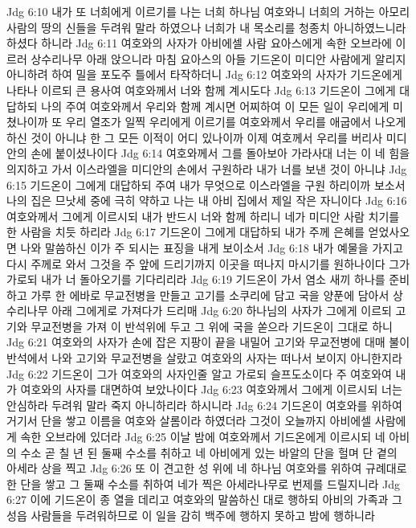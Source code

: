 Jdg 6:10  내가 또 너희에게 이르기를 나는 너희 하나님 여호와니 너희의 거하는 아모리 사람의 땅의 신들을 두려워 말라 하였으나 너희가 내 목소리를 청종치 아니하였느니라 하셨다 하니라
Jdg 6:11  여호와의 사자가 아비에셀 사람 요아스에게 속한 오브라에 이르러 상수리나무 아래 앉으니라 마침 요아스의 아들 기드온이 미디안 사람에게 알리지 아니하려 하여 밀을 포도주 틀에서 타작하더니
Jdg 6:12  여호와의 사자가 기드온에게 나타나 이르되 큰 용사여 여호와께서 너와 함께 계시도다
Jdg 6:13  기드온이 그에게 대답하되 나의 주여 여호와께서 우리와 함께 계시면 어찌하여 이 모든 일이 우리에게 미쳤나이까 또 우리 열조가 일찍 우리에게 이르기를 여호와께서 우리를 애굽에서 나오게 하신 것이 아니냐 한 그 모든 이적이 어디 있나이까 이제 여호께서 우리를 버리사 미디안의 손에 붙이셨나이다
Jdg 6:14  여호와께서 그를 돌아보아 가라사대 너는 이 네 힘을 의지하고 가서 이스라엘을 미디안의 손에서 구원하라 내가 너를 보낸 것이 아니냐
Jdg 6:15  기드온이 그에게 대답하되 주여 내가 무엇으로 이스라엘을 구원 하리이까 보소서 나의 집은 므낫세 중에 극히 약하고 나는 내 아비 집에서 제일 작은 자니이다
Jdg 6:16  여호와께서 그에게 이르시되 내가 반드시 너와 함께 하리니 네가 미디안 사람 치기를 한 사람을 치듯 하리라
Jdg 6:17  기드온이 그에게 대답하되 내가 주께 은혜를 얻었사오면 나와 말씀하신 이가 주 되시는 표징을 내게 보이소서
Jdg 6:18  내가 예물을 가지고 다시 주께로 와서 그것을 주 앞에 드리기까지 이곳을 떠나지 마시기를 원하나이다 그가 가로되 내가 너 돌아오기를 기다리리라
Jdg 6:19  기드온이 가서 염소 새끼 하나를 준비하고 가루 한 에바로 무교전병을 만들고 고기를 소쿠리에 담고 국을 양푼에 담아서 상수리나무 아래 그에게로 가져다가 드리매
Jdg 6:20  하나님의 사자가 그에게 이르되 고기와 무교전병을 가져 이 반석위에 두고 그 위에 국을 쏟으라 기드온이 그대로 하니
Jdg 6:21  여호와의 사자가 손에 잡은 지팡이 끝을 내밀어 고기와 무교전병에 대매 불이 반석에서 나와 고기와 무교전병을 살랐고 여호와의 사자는 떠나서 보이지 아니한지라
Jdg 6:22  기드온이 그가 여호와의 사자인줄 알고 가로되 슬프도소이다 주 여호와여 내가 여호와의 사자를 대면하여 보았나이다
Jdg 6:23  여호와께서 그에게 이르시되 너는 안심하라 두려워 말라 죽지 아니하리라 하시니라
Jdg 6:24  기드온이 여호와를 위하여 거기서 단을 쌓고 이름을 여호와 살롬이라 하였더라 그것이 오늘까지 아비에셀 사람에게 속한 오브라에 있더라
Jdg 6:25  이날 밤에 여호와께서 기드온에게 이르시되 네 아비의 수소 곧 칠 년 된 둘째 수소를 취하고 네 아비에게 있는 바알의 단을 헐며 단 곁의 아세라 상을 찍고
Jdg 6:26  또 이 견고한 성 위에 네 하나님 여호와를 위하여 규례대로 한 단을 쌓고 그 둘째 수소를 취하여 네가 찍은 아세라나무로 번제를 드릴지니라
Jdg 6:27  이에 기드온이 종 열을 데리고 여호와의 말씀하신 대로 행하되 아비의 가족과 그 성읍 사람들을 두려워하므로 이 일을 감히 백주에 행하지 못하고 밤에 행하니라
